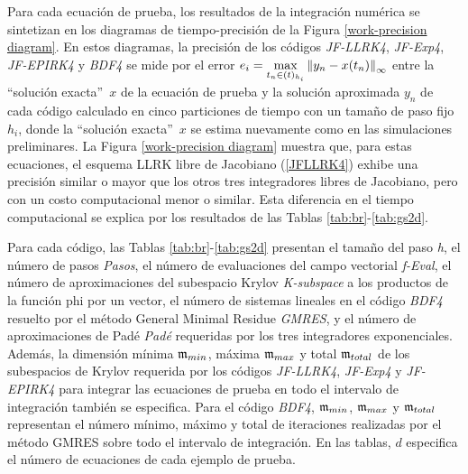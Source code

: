 Para cada ecuación de prueba, los resultados de la integración numérica se sintetizan en los diagramas de tiempo-precisión de la Figura \ref{work-precision diagram}. En estos diagramas, la precisión de los códigos \textit{JF-LLRK4}, \textit{JF-Exp4}, \textit{JF-EPIRK4} y \textit{BDF4} se mide por el error $e_i=\max\limits_ {t_n\in(t)_{h_i}}\left\lVert y_n-x(t_n) \right\rVert_\infty$ entre la \textquotedblleft solución exacta\textquotedblright~$x$ de la ecuación de prueba y la solución aproximada $y_n$ de cada código calculado en cinco particiones de tiempo con un tamaño de paso fijo $h_i$, donde la \textquotedblleft solución exacta\textquotedblright ~$x $ se estima nuevamente como en las simulaciones preliminares. La Figura \ref{work-precision diagram} muestra que, para estas ecuaciones, el esquema LLRK libre de Jacobiano (\ref{JFLLRK4}) exhibe una precisión similar o mayor que los otros tres integradores libres de Jacobiano, pero con un costo computacional menor o similar. Esta diferencia en el tiempo computacional se explica por los resultados de las Tablas \ref{tab:br}-\ref{tab:gs2d}.

Para cada código, las Tablas \ref{tab:br}-\ref{tab:gs2d} presentan el tamaño del paso \textit{h}, el número de pasos \textit{Pasos}, el número de evaluaciones del campo vectorial \textit{f-Eval}, el número de aproximaciones del subespacio Krylov \textit{K-subspace} a los productos de la función phi por un vector, el número de sistemas lineales en el código \textit{BDF4} resuelto por el método General Minimal Residue \textit {GMRES}, y el número de aproximaciones de Padé \textit{Padé} requeridas por los tres integradores exponenciales. Además, la dimensión mínima $\mathfrak{m}_{min}$, máxima $\mathfrak{m}_{max}$ y total $\mathfrak{m}_{total}$ de los subespacios de Krylov requerida por los códigos \textit{JF-LLRK4}, \textit{JF-Exp4} y \textit{JF-EPIRK4} para integrar las ecuaciones de prueba en todo el intervalo de integración también se especifica. Para el código \emph{BDF4}, $\mathfrak{m}_{min}$, $\mathfrak{m}_{max}$ y $\mathfrak{m}_{total}$ representan el número mínimo, máximo y total de iteraciones realizadas por el método GMRES sobre todo el intervalo de integración. En las tablas, $d$ especifica el número de ecuaciones de cada ejemplo de prueba.

\vspace{0.1cm}

